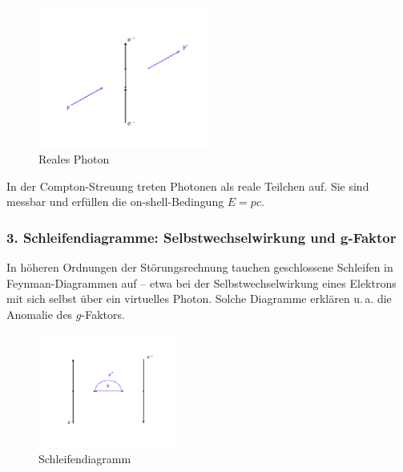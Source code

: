 \begin{figure}[H]
	\begin{center}
		\includegraphics[width=0.5\textwidth]{bilder/compton-diagramm.pdf}
	\end{center}
	\caption{Reales Photon}
\end{figure}

\begin{tcolorbox}[physikbox, title=Reale Photonen]
	\label{box:Reale Photonen}
	In der Compton-Streuung treten Photonen als reale Teilchen auf. Sie sind messbar und erfüllen die on-shell-Bedingung $E = pc$.
\end{tcolorbox}

\subsubsection*{3. Schleifendiagramme: Selbstwechselwirkung und g-Faktor}
In höheren Ordnungen der Störungsrechnung tauchen geschlossene Schleifen in Feynman-Diagrammen auf – etwa bei der Selbstwechselwirkung eines Elektrons mit sich selbst über ein virtuelles Photon. Solche Diagramme erklären u.\,a. die Anomalie des $g$-Faktors.
\begin{figure}[H]
	\begin{center}
		\includegraphics[width=0.4\textwidth]{bilder/vertex-korrektur.pdf}
	\end{center}
	\caption{Schleifendiagramm}
\end{figure}

